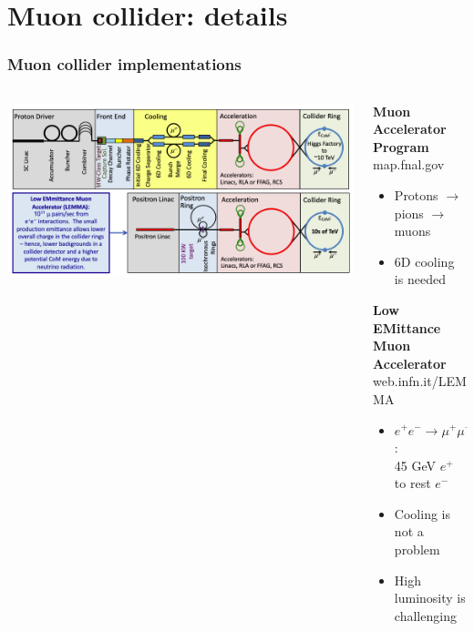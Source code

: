 \documentclass[aspectratio=169]{beamer}
\begin{document}
\section{Muon collider: details}
\begin{frame}
	\frametitle{Muon collider implementations}
	\begin{columns}
		\begin{column}{0.6\textwidth}
			\centering
			\includegraphics[width=1\textwidth]{figs/muC.png}
		\end{column}
		\hspace{-3mm}
		\begin{column}{0.42\textwidth}
			{\bf \textcolor{PittRoyal}{M}uon \textcolor{PittRoyal}{A}ccelerator \textcolor{PittRoyal}{P}rogram }\\
			\textcolor{INFNBlue2}{map.fnal.gov}\hfill{}
			\begin{itemize}
				\item Protons $\to$ pions $\to$ muons
				\item 6D cooling is needed
			\end{itemize}
			{\bf \textcolor{PittRoyal}{L}ow \textcolor{PittRoyal}{EM}ittance \textcolor{PittRoyal}{M}uon \textcolor{PittRoyal}{A}ccelerator}\\\textcolor{INFNBlue2}{web.infn.it/LEMMA}\hfill{}
			\begin{itemize}
				\item $e^+ e^- \to \mu^+ \mu^-$: \\
			    45 GeV $e^+$ to rest $e^-$ 
				\item Cooling is not a problem
				\item High luminosity is challenging
			\end{itemize}	
		\end{column}
	\end{columns}
\end{frame}
\end{document}
